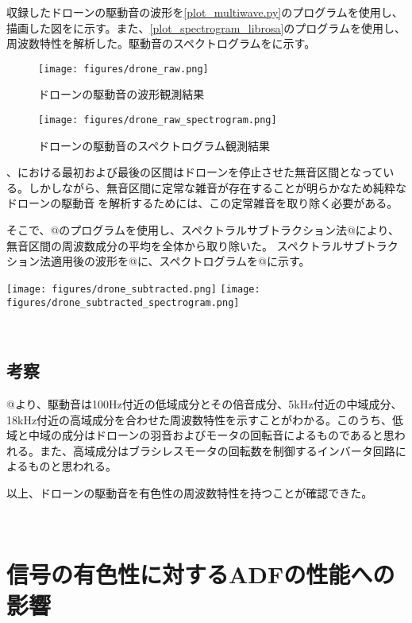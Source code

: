 収録したドローンの駆動音の波形を\ref{plot_multiwave.py}のプログラムを使用し、描画した図をに示す。また、\ref{plot_spectrogram_librosa}のプログラムを使用し、周波数特性を解析した。駆動音のスペクトログラムをに示す。

\begin{figure}[H]
\centering
\texttt{[image: figures/drone\_raw.png]}
\caption{ドローンの駆動音の波形観測結果}
\label{fig:drone_raw}
\end{figure}

\begin{figure}[H]
\centering
\texttt{[image: figures/drone\_raw\_spectrogram.png]}
\caption{ドローンの駆動音のスペクトログラム観測結果}
\label{fig:drone_raw_spectrogram}
\end{figure}

、における最初および最後の区間はドローンを停止させた無音区間となっている。しかしながら、無音区間に定常な雑音が存在することが明らかなため純粋なドローンの駆動音を解析するためには、この定常雑音を取り除く必要がある。

そこで、@のプログラムを使用し、スペクトラルサブトラクション法@により、無音区間の周波数成分の平均を全体から取り除いた。
スペクトラルサブトラクション法適用後の波形を@に、スペクトログラムを@に示す。

\texttt{[image: figures/drone\_subtracted.png]}
\texttt{[image: figures/drone\_subtracted\_spectrogram.png]}

\
\subsection{考察}\label{consideration-drone}

@より、駆動音は100Hz付近の低域成分とその倍音成分、5kHz付近の中域成分、18kHz付近の高域成分を合わせた周波数特性を示すことがわかる。このうち、低域と中域の成分はドローンの羽音およびモータの回転音によるものであると思われる。また、高域成分はブラシレスモータの回転数を制御するインバータ回路によるものと思われる。

以上、ドローンの駆動音を有色性の周波数特性を持つことが確認できた。

\
\section{信号の有色性に対するADFの性能への影響}\label{adf-color-effect}

\
